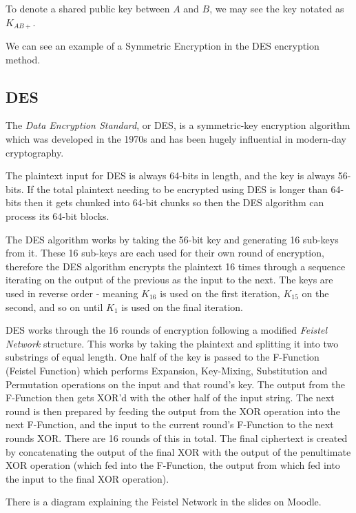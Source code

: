To denote a shared public key between $A$ and $B$, we may see the key notated as $K_{AB+}$.

We can see an example of a Symmetric Encryption in the DES encryption method.

\subsection{DES}
The \textit{Data Encryption Standard}, or DES, is a symmetric-key encryption algorithm which was developed in the 1970s and has been hugely influential in modern-day cryptography.

The plaintext input for DES is always 64-bits in length, and the key is always 56-bits. If the total plaintext needing to be encrypted using DES is longer than 64-bits then it gets chunked into 64-bit chunks so then the DES algorithm can process its 64-bit blocks. 

The DES algorithm works by taking the 56-bit key and generating 16 sub-keys from it. These 16 sub-keys are each used for their own round of encryption, therefore the DES algorithm encrypts the plaintext 16 times through a sequence iterating on the output of the previous as the input to the next. The keys are used in reverse order - meaning $K_{16}$ is used on the first iteration, $K_{15}$ on the second, and so on until $K_1$ is used on the final iteration. 

DES works through the 16 rounds of encryption following a modified \textit{Feistel Network} structure. This works by taking the plaintext and splitting it into two substrings of equal length. One half of the key is passed to the F-Function (Feistel Function) which performs Expansion, Key-Mixing, Substitution and Permutation operations on the input and that round's key. The output from the F-Function then gets XOR'd with the other half of the input string. The next round is then prepared by feeding the output from the XOR operation into the next F-Function, and the input to the current round's F-Function to the next rounds XOR. There are 16 rounds of this in total. The final ciphertext is created by concatenating the output of the final XOR with the output of the penultimate XOR operation (which fed into the F-Function, the output from which fed into the input to the final XOR operation). 

\begin{extlink}
There is a diagram explaining the Feistel Network in the slides on Moodle.
\end{extlink}


